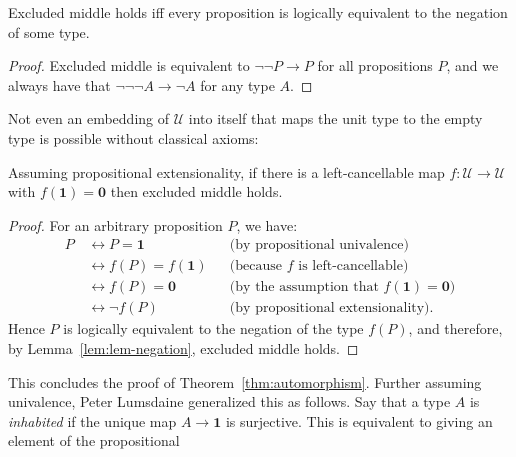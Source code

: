 \documentclass[a4paper,UKenglish]{lipics-v2016}
\newcommand{\UU}{\mathcal{U}}
\newcommand{\Empty}{\mathbf{0}}
\newcommand{\unit}{\mathbf{1}}
\begin{document}
\begin{lemma}
\label{lem:lem-negation}
  Excluded middle holds iff every proposition is logically equivalent
  to the negation of some type.
\end{lemma}
\begin{proof}
  Excluded middle is equivalent to $\neg \neg P \to P$ for all
  propositions $P$, and we always have that
  $\neg\neg\neg A \to \neg A$ for any type $A$.
\end{proof}

Not even an embedding of $\UU$ into itself that maps the unit type to
the empty type is possible without classical axioms:
\begin{lemma} \label{left:cancellable} Assuming propositional
  extensionality, if there is a left-cancellable map $f: \UU \to \UU$
  with $f(\unit)=\Empty$ then excluded middle holds.
\end{lemma}
\begin{proof}
  For an arbitrary proposition $P$, we have:
  \begin{align*}
    P \,\!& \leftrightarrow  P = \unit \quad
    && \mbox{(by propositional univalence)}
    \\
        &\leftrightarrow  f(P)=f(\unit)
    && \mbox{(because $f$ is left-cancellable)}
    \\
        &\leftrightarrow f(P)=\Empty
    && \mbox{(by the assumption that $f(\unit)=\Empty$)}
    \\
        &\leftrightarrow \neg f(P)
          && \mbox{(by propositional extensionality).}
  \end{align*}
  Hence $P$ is logically equivalent to the negation of the type
  $f(P)$, and therefore, by Lemma~\ref{lem:lem-negation}, excluded
  middle holds.
\end{proof}
This concludes the proof of Theorem~\ref{thm:automorphism}. Further
assuming univalence, Peter Lumsdaine generalized this as follows.  Say
that a type $A$ is \emph{inhabited} if the unique map $A\to\unit$ is
surjective. This is equivalent to giving an element of the propositional
\end{document}
